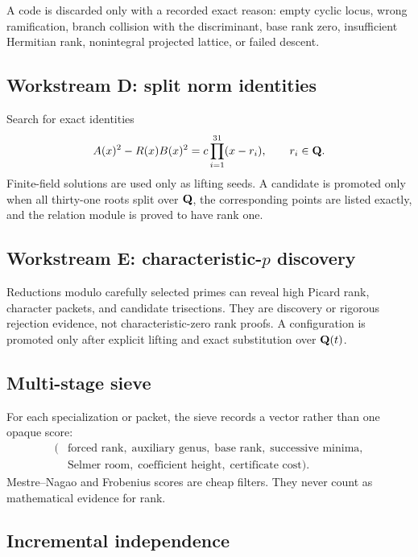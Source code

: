 A code is discarded only with a recorded exact reason: empty cyclic locus,
wrong ramification, branch collision with the discriminant, base rank zero,
insufficient Hermitian rank, nonintegral projected lattice, or failed descent.

\subsection{Workstream D: split norm identities}

Search for exact identities
\[
A(x)^2-R(x)B(x)^2
=c\prod_{i=1}^{31}(x-r_i),
\qquad r_i\in\mathbf Q.
\]
Finite-field solutions are used only as lifting seeds.  A candidate is promoted
only when all thirty-one roots split over $\mathbf Q$, the corresponding points are
listed exactly, and the relation module is proved to have rank one.

\subsection{Workstream E: characteristic-$p$ discovery}

Reductions modulo carefully selected primes can reveal high Picard rank,
character packets, and candidate trisections.  They are discovery or rigorous
rejection evidence, not characteristic-zero rank proofs.  A configuration is
promoted only after explicit lifting and exact substitution over $\mathbf Q(t)$.

\subsection{Multi-stage sieve}

For each specialization or packet, the sieve records a vector rather than one
opaque score:
\[
\begin{aligned}
(&\text{forced rank},\;\text{auxiliary genus},\;\text{base rank},\;
  \text{successive minima},\\
 &\text{Selmer room},\;\text{coefficient height},\;
  \text{certificate cost}).
\end{aligned}
\]
Mestre--Nagao and Frobenius scores are cheap filters.  They never count as
mathematical evidence for rank.

\subsection{Incremental independence}

